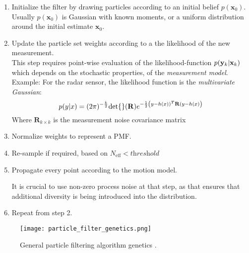 \begin{enumerate}
	\item Initialize the filter by drawing particles according to an initial belief $p(\mathbf{x}_0)$.\\
	
	Usually  $p(\mathbf{x}_0)$ is Gaussian with known moments, or a uniform distribution around the initial estimate  $\mathbf{x}_{0}$.
	
	\item Update the particle set weights according to a the likelihood of the new measurement.\\
	
	This step requires point-wise evaluation of the likelihood-function $p(\mathbf{{{y}}}_k | \mathbf{x}_k)$ which depends on the stochastic properties, of the \emph{measurement model}.\\
	
	Example: For the radar sensor, the likelihood function is the \emph{multivariate Gaussian}:
	$$
	p({{y}}|x) = (2\pi)^{-\frac{k}{2}}{\text{det}\{{}\}}(\mathbf{R})e^{-\frac{1}{2}\left({{y}}-h(x))^{T}\mathbf{R}({{y}}-h(x)\right)}
	$$
	Where $\mathbf{R}_{k\times k}$ is the measurement noise covariance matrix
	
	
	\item Normalize weights to represent a PMF.
	\item Re-sample if required, based on $N_{\text{eff}} < \textit{threshold}$
	\item Propagate every point according to the motion model.
	
	It is crucial to use non-zero process noise at that step, as that ensures that additional diversity is being introduced into the distribution.
	
	\item Repeat from step 2.
\end{enumerate}



\begin{figure}[H]
	\centering
	\texttt{[image: particle\_filter\_genetics.png]}
	\caption{General particle filtering algorithm genetics \cite{Chatzi2002}.}
	\label{fig:PF_genetics}
\end{figure}

